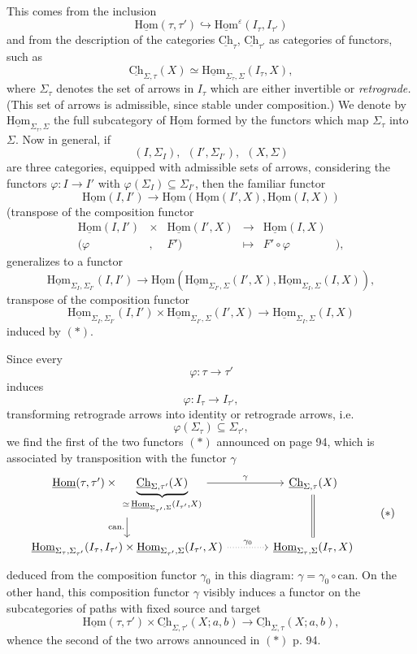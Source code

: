 \documentclass[11pt]{article}
\newcommand{\printedpage}[1]{\marginpar{\footnotesize p.~#1}}
\newcommand{\msp}[1]{\marginpar{\footnotesize [#1]}}
\newcommand{\uHom}{\underline{\mathrm{Hom}}}
\newcommand{\uCh}{\underline{\mathrm{Ch}}}
\begin{document}
This comes from the inclusion
\[
\uHom(\tau,\tau')\hookrightarrow\uHom^{\varepsilon}(I_\tau,I_{\tau'})
\]
and from the description of the categories $\uCh_\tau$, $\uCh_{\tau'}$ as categories of functors, such as
\[
\uCh_{\Sigma,\tau}(X)\simeq\uHom_{\Sigma_\tau,\Sigma}(I_\tau,X),
\]
where $\Sigma_\tau$ denotes the set of arrows in $I_\tau$ which are either invertible or \textit{retrograde.} (This set of arrows is admissible, since stable under composition.) We denote by $\uHom_{\Sigma_\tau,\Sigma}$ the full subcategory of $\uHom$ formed by the functors which map $\Sigma_\tau$ into $\Sigma$. Now in general, if
\[
(I,\Sigma_I),\ \ (I',\Sigma_{I'}),\ \ (X,\Sigma)
\]
are three categories, equipped with admissible sets of arrows, considering the functors $\varphi:I\longrightarrow I'$ with $\varphi(\Sigma_I)\subseteq\Sigma_{I'}$, then the familiar functor
\[
\uHom(I,I')\longrightarrow\uHom(\uHom(I',X),\uHom(I,X))
\]
(transpose of the composition functor
\[
\begin{matrix}
\uHom(I,I') & \times & \uHom(I',X) & \longrightarrow & \uHom(I,X) & \\
(\varphi & , & F') & \longmapsto & F'\circ\varphi & ),
\end{matrix}
\]
generalizes to a functor
\[
\uHom_{\Sigma_I,\Sigma_{I'}}(I,I')\longrightarrow\uHom(\uHom_{\Sigma_{I'},\Sigma}(I',X),\uHom_{\Sigma_I,\Sigma}(I,X)),
\tag*{$(*)$}
\]
transpose of the composition functor
\[
\uHom_{\Sigma_I,\Sigma_{I'}}(I,I')\times\uHom_{\Sigma_{I'},\Sigma}(I',X)\longrightarrow\uHom_{\Sigma_I,\Sigma}(I,X)
\]
induced by $(*)$.

\msp{page 96}

Since every
\[
\varphi:\tau\longrightarrow\tau'
\]
induces
\[
\varphi:I_\tau\longrightarrow I_{\tau'},
\]
transforming retrograde arrows into identity or retrograde arrows, i.e.
\[
\varphi(\Sigma_\tau)\subseteq\Sigma_{\tau'},
\]
\printedpage{62}
we find the first of the two functors $(*)$ announced on page 94, which is associated by transposition with the functor $\gamma$
\[
\begin{tikzcd}[column sep=large]
\uHom(\tau,\tau')\times\ \underbrace{\uCh_{\Sigma,\tau'}(X)}_{\simeq\,\uHom_{\Sigma_{\tau'},\Sigma}(I_{\tau'},X)} \arrow[r, "\gamma"] \arrow[d, "\text{can.}"'] & \uCh_{\Sigma,\tau}(X) \arrow[d, equal]\\
\uHom_{\Sigma_\tau,\Sigma_{\tau'}}(I_\tau,I_{\tau'})\times\uHom_{\Sigma_{\tau'},\Sigma}(I_{\tau'},X) \arrow[r, dotted, "\gamma_0"] & \uHom_{\Sigma_\tau,\Sigma}(I_\tau,X)
\end{tikzcd}
\tag*{$(*)$}
\]
deduced from the composition functor $\gamma_0$ in this diagram: $\gamma=\gamma_0\circ\mathrm{can}.$ On the other hand, this composition functor $\gamma$ visibly induces a functor on the subcategories of paths with fixed source and target
\[
\uHom(\tau,\tau')\times\uCh_{\Sigma,\tau'}(X;a,b)\longrightarrow\uCh_{\Sigma,\tau}(X;a,b),
\]
whence the second of the two arrows announced in $(*)$ p. 94.
\end{document}
